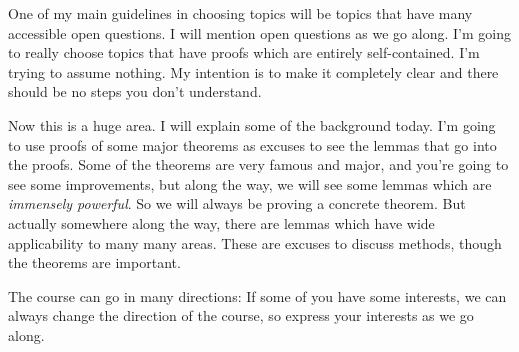 One of my main guidelines in choosing topics will be topics that have many accessible open questions. I will mention open questions as we go along. I'm going to really choose topics that have proofs which are entirely self-contained. I'm trying to assume nothing. My intention is to make it completely clear and there should be no steps you don't understand. 

Now this is a huge area. I will explain some of the background today. I'm going to use proofs of some major theorems as excuses to see the lemmas that go into the proofs. Some of the theorems are very famous and major, and you're going to see some improvements, but along the way, we will see some lemmas which are \emph{immensely powerful}. So we will always be proving a concrete theorem. But actually somewhere along the way, there are lemmas which have wide applicability to many many areas. These are excuses to discuss methods, though the theorems are important. 

The course can go in many directions: If some of you have some interests, we can always change the direction of the course, so express your interests as we go along. 




















%

%
%

\printnomenclature
\printindex
